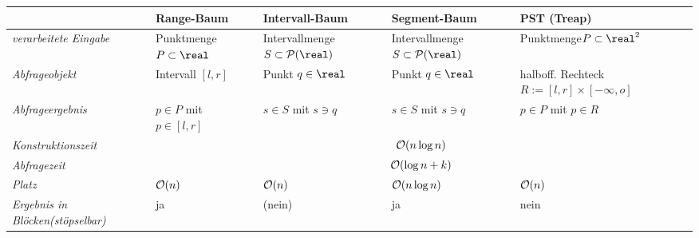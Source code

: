 {\footnotesize
\begin{tabular}{p{32mm}p{29mm}p{29mm}p{29mm}p{29mm}}
    \toprule
    &
    \textbf{Range-Baum}&
    \textbf{Intervall-Baum}&
    \textbf{Segment-Baum}&
    \textbf{PST (Treap)}\\
    
    \midrule
    \emph{verarbeitete Eingabe}&
    Punktmenge\newline$P \subset \real$&
    Intervallmenge\newline$S \subset \P(\real)$&
    Intervallmenge\newline$S \subset \P(\real)$&
    Punktmenge\newline$P \subset \real^2$\\
    
    \midrule
    \emph{Abfrageobjekt}&
    Intervall $[l, r]$&
    Punkt $q \in \real$&
    Punkt $q \in \real$&
    halboff. Rechteck\newline$R := [l, r] \times [-\infty, o]$\\
    
    \midrule
    \emph{Abfrageergebnis}&
    $p \in P$ mit $p \in [l, r]$&
    $s \in S$ mit $s \ni q$&
    $s \in S$ mit $s \ni q$&
    $p \in P$ mit $p \in R$\\
    
    \midrule
    \emph{Konstruktionszeit}&
    \multicolumn{4}{c}{$\mathcal{O}(n \log n)$}\\
    
    \midrule
    \emph{Abfragezeit}&
    \multicolumn{4}{c}{$\mathcal{O}(\log n + k)$}\\
    
    \midrule
    \emph{Platz}&
    $\mathcal{O}(n)$&
    $\mathcal{O}(n)$&
    $\mathcal{O}(n \log n)$&
    $\mathcal{O}(n)$\\
    
    \midrule
    \emph{Ergebnis in Blöcken\newline(stöpselbar)}&
    ja&
    (nein)&
    ja&
    nein\\
    
    \bottomrule
\end{tabular}}

\pagebreak
